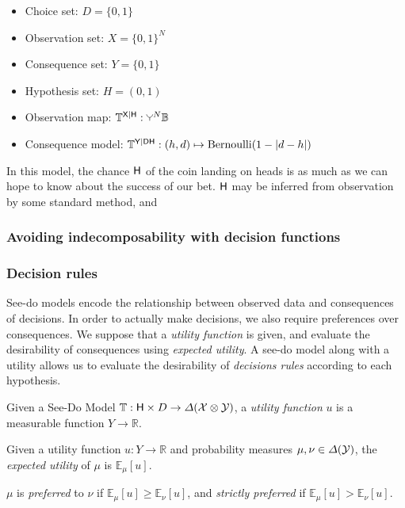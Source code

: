 \begin{itemize}
    \item Choice set: $D=\{0,1\}$
    \item Observation set: $X=\{0,1\}^N$
    \item Consequence set: $Y=\{0,1\}$
    \item Hypothesis set: $H=(0,1)$
    \item Observation map: ${\kernel{T}}^{\RV{X}|\RV{H}}:\splitter{0.1}^N\kernel{B}$
    \item Consequence model: ${\mathbb{T}}^{\mathsf{Y}|\mathsf{D}\mathsf{H}}:(h,d)\mapsto \mathrm{Bernoulli}(1-|d-h|)$
\end{itemize}

In this model, the chance $\mathsf{H}$ of the coin landing on heads is as much as we can hope to know about the success of our bet. $\mathsf{H}$ may be inferred from observation by some standard method, and 



\subsubsection{Avoiding indecomposability with decision functions}


\subsubsection{Decision rules}

See-do models encode the relationship between observed data and consequences of decisions. In order to actually make decisions, we also require preferences over consequences. We suppose that a \emph{utility function} is given, and evaluate the desirability of consequences using \emph{expected utility}. A see-do model along with a utility allows us to evaluate the desirability of \emph{decisions rules} according to each hypothesis.

\begin{definition}
Given a See-Do Model $\mathbb{T}:\mathsf{H}\times D\to \Delta(\mathcal{X}\otimes\mathcal{Y})$, a \emph{utility function} $u$ is a measurable function $Y\to \mathbb{R}$. 
\end{definition}

\begin{definition}
Given a utility function $u:Y\to \mathbb{R}$ and probability measures $\mu,\nu\in \Delta(\mathcal{Y})$, the \emph{expected utility} of $\mu$ is $\mathbb{E}_{\mu}[u]$.

$\mu$ is \emph{preferred} to $\nu$ if $\mathbb{E}_{\mu}[u]\geq \mathbb{E}_{\nu}[u]$, and \emph{strictly preferred} if $\mathbb{E}_{\mu}[u]>\mathbb{E}_{\nu}[u]$.
\end{definition}

